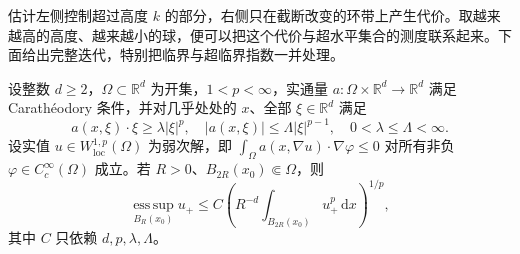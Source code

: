 估计左侧控制超过高度 \(k\) 的部分，右侧只在截断改变的环带上产生代价。取越来越高的高度、越来越小的球，便可以把这个代价与超水平集合的测度联系起来。下面给出完整迭代，特别把临界与超临界指数一并处理。

\begin{theorem}[非线性次解的局部有界性]
\label{b2:thm:H2-p-bounded}
设整数 \(d\ge2\)，\(\Omega\subset\mathbb R^d\) 为开集，\(1<p<\infty\)，实通量 \(a:\Omega\times\mathbb R^d\to\mathbb R^d\) 满足 Carathéodory 条件，并对几乎处处的 \(x\)、全部 \(\xi\in\mathbb R^d\) 满足
\[
 a(x,\xi)\cdot\xi\ge\lambda|\xi|^p,
 \quad |a(x,\xi)|\le\Lambda|\xi|^{p-1},
 \quad 0<\lambda\le\Lambda<\infty.
\]
设实值 \(u\in W^{1,p}_{\mathrm{loc}}(\Omega)\) 为弱次解，即
\(\int_\Omega a(x,\nabla u)\cdot\nabla\varphi\le0\)
对所有非负 \(\varphi\in C_c^\infty(\Omega)\) 成立。若 \(R>0\)、\(B_{2R}(x_0)\Subset\Omega\)，则
\[
 \operatorname*{ess\,sup}_{B_R(x_0)}u_+
 \le C\left(R^{-d}\int_{B_{2R}(x_0)}u_+^p\,\mathrm dx\right)^{1/p},
\]
其中 \(C\) 只依赖 \(d,p,\lambda,\Lambda\)。
\end{theorem}
